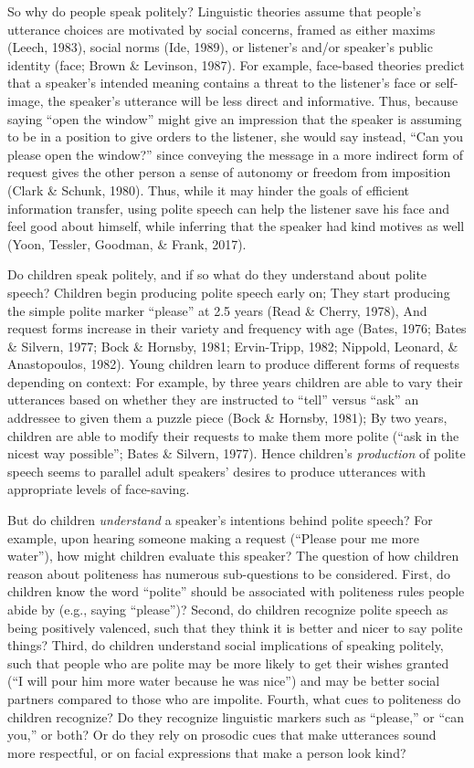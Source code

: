 \documentclass[10pt, letterpaper]{article}
\begin{document}
So why do people speak politely? Linguistic theories assume that
people's utterance choices are motivated by social concerns, framed as
either maxims (Leech, 1983), social norms (Ide, 1989), or listener's
and/or speaker's public identity (face; Brown \& Levinson, 1987). For
example, face-based theories predict that a speaker's intended meaning
contains a threat to the listener's face or self-image, the speaker's
utterance will be less direct and informative. Thus, because saying
``open the window'' might give an impression that the speaker is
assuming to be in a position to give orders to the listener, she would
say instead, ``Can you please open the window?'' since conveying the
message in a more indirect form of request gives the other person a
sense of autonomy or freedom from imposition (Clark \& Schunk, 1980).
Thus, while it may hinder the goals of efficient information transfer,
using polite speech can help the listener save his face and feel good
about himself, while inferring that the speaker had kind motives as well
(Yoon, Tessler, Goodman, \& Frank, 2017).

Do children speak politely, and if so what do they understand about
polite speech? Children begin producing polite speech early on; They
start producing the simple polite marker ``please'' at 2.5 years (Read
\& Cherry, 1978), And request forms increase in their variety and
frequency with age (Bates, 1976; Bates \& Silvern, 1977; Bock \&
Hornsby, 1981; Ervin-Tripp, 1982; Nippold, Leonard, \& Anastopoulos,
1982). Young children learn to produce different forms of requests
depending on context: For example, by three years children are able to
vary their utterances based on whether they are instructed to ``tell''
versus ``ask'' an addressee to given them a puzzle piece (Bock \&
Hornsby, 1981); By two years, children are able to modify their requests
to make them more polite (``ask in the nicest way possible''; Bates \&
Silvern, 1977). Hence children's \emph{production} of polite speech
seems to parallel adult speakers' desires to produce utterances with
appropriate levels of face-saving.

But do children \emph{understand} a speaker's intentions behind polite
speech? For example, upon hearing someone making a request (``Please
pour me more water''), how might children evaluate this speaker? The
question of how children reason about politeness has numerous
sub-questions to be considered. First, do children know the word
``polite'' should be associated with politeness rules people abide by
(e.g., saying ``please'')? Second, do children recognize polite speech
as being positively valenced, such that they think it is better and
nicer to say polite things? Third, do children understand social
implications of speaking politely, such that people who are polite may
be more likely to get their wishes granted (``I will pour him more water
because he was nice'') and may be better social partners compared to
those who are impolite. Fourth, what cues to politeness do children
recognize? Do they recognize linguistic markers such as ``please,'' or
``can you,'' or both? Or do they rely on prosodic cues that make
utterances sound more respectful, or on facial expressions that make a
person look kind?
\end{document}
